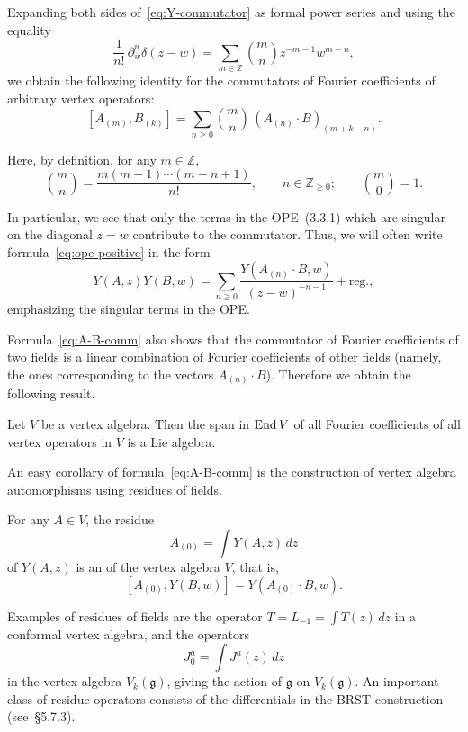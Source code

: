\documentclass[12pt]{article}
\begin{document}
Expanding both sides of~\eqref{eq:Y-commutator} as formal power series and using the equality
\[
    \frac{1}{n!}\,\partial_w^n\delta(z-w)
    = \sum_{m\in\mathbb{Z}}\binom{m}{n}z^{-m-1}w^{m-n},
\]
we obtain the following identity for the commutators of Fourier coefficients of arbitrary vertex operators:
\begin{equation}\label{eq:A-B-comm}
    [A_{(m)},B_{(k)}]
    = \sum_{n\ge0}\binom{m}{n}\,(A_{(n)}\cdot B)_{(m+k-n)}.
\end{equation}

Here, by definition, for any $m\in\mathbb{Z}$,
\[
    \binom{m}{n}
    = \frac{m(m-1)\cdots(m-n+1)}{n!}, \qquad n\in\mathbb{Z}_{\ge0}; \qquad \binom{m}{0}=1.
\]

In particular, we see that only the terms in the OPE~(3.3.1) which are singular on the diagonal $z=w$ contribute to the commutator.
Thus, we will often write formula~\eqref{eq:ope-positive} in the form
\[
    Y(A,z)Y(B,w)
    = \sum_{n\ge0}\frac{Y(A_{(n)}\cdot B,w)}{(z-w)^{-n-1}} + \text{reg.},
\]
emphasizing the singular terms in the OPE.

Formula~\eqref{eq:A-B-comm} also shows that the commutator of Fourier coefficients of two fields is a linear combination of Fourier coefficients of other fields (namely, the ones corresponding to the vectors $A_{(n)}\cdot B$).
Therefore we obtain the following result.

\begin{proposition}[3.3.7]
    Let $V$ be a vertex algebra.
    Then the span in $\operatorname{End} V$ of all Fourier coefficients of all vertex operators in $V$ is a Lie algebra.
\end{proposition}

An easy corollary of formula~\eqref{eq:A-B-comm} is the construction of vertex algebra automorphisms using residues of fields.

\begin{corollary}[3.3.8]
    For any $A\in V$, the residue
    \[
        A_{(0)} = \int Y(A,z)\,dz
    \]
    of $Y(A,z)$ is an  of the vertex algebra $V$, that is,
    \[
        [A_{(0)},Y(B,w)] = Y(A_{(0)}\cdot B,w).
    \]
\end{corollary}

\noindent
Examples of residues of fields are the operator $T = L_{-1} = \int T(z)\,dz$ in a conformal vertex algebra, and the operators
\[
    J^a_0 = \int J^a(z)\,dz
\]
in the vertex algebra $V_k(\mathfrak{g})$, giving the action of $\mathfrak{g}$ on $V_k(\mathfrak{g})$.
An important class of residue operators consists of the differentials in the BRST construction (see~\S5.7.3).
\end{document}

